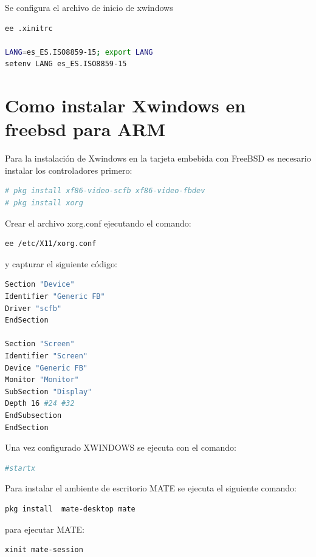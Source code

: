 \documentclass[12pt,twoside]{book}
\begin{document}
Se configura el archivo de inicio de xwindows

\begin{lstlisting}[language=bash]
ee .xinitrc

LANG=es_ES.ISO8859-15; export LANG
setenv LANG es_ES.ISO8859-15
\end{lstlisting}

\section{Como instalar Xwindows en freebsd para ARM}
Para la instalación de Xwindows en la tarjeta embebida con FreeBSD es necesario instalar los controladores primero:

\begin{lstlisting}[language=bash]
# pkg install xf86-video-scfb xf86-video-fbdev
# pkg install xorg
\end{lstlisting}

Crear el archivo xorg.conf ejecutando el comando: 

\begin{lstlisting}[language=bash]
ee /etc/X11/xorg.conf
\end{lstlisting}

y capturar el siguiente código:

\begin{lstlisting}[language=bash]
Section "Device"
Identifier "Generic FB"
Driver "scfb"
EndSection

Section "Screen"
Identifier "Screen"
Device "Generic FB"
Monitor "Monitor"
SubSection "Display"
Depth 16 #24 #32
EndSubsection
EndSection
\end{lstlisting}

Una vez configurado XWINDOWS se ejecuta con el comando:

\begin{lstlisting}[language=bash]
#startx 
\end{lstlisting}

Para instalar el ambiente de escritorio MATE se ejecuta el siguiente comando:
 
\begin{lstlisting}[language=bash]
pkg install  mate-desktop mate 
\end{lstlisting}


para ejecutar MATE:

\begin{lstlisting}[language=bash]
xinit mate-session 
\end{lstlisting}
\end{document}

